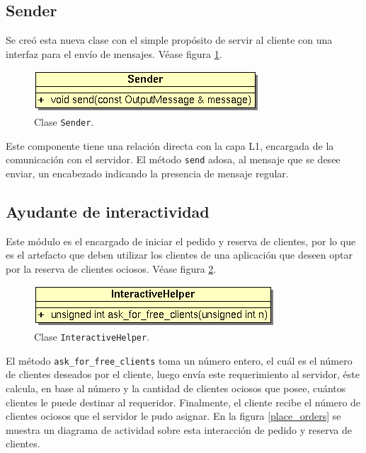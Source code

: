\subsection{Sender}

Se creó esta nueva clase con el simple propósito de servir al cliente con una interfaz para el envío de mensajes. Véase figura
\ref{fud_sender}.

\begin{figure}[ht]
    \begin{center}
        \includegraphics[scale=.75]{images/fud_sender.png}
        \caption{Clase \texttt{Sender}.}
        \label{fud_sender}
    \end{center}
\end{figure}

Este componente tiene una relación directa con la capa L1, encargada de la comunicación con el servidor. El método \texttt{send} adosa, al
mensaje que se desee enviar, un encabezado indicando la presencia de mensaje regular.

\subsection{Ayudante de interactividad}

Este módulo es el encargado de iniciar el pedido y reserva de clientes, por lo que es el artefacto que deben utilizar los clientes de una
aplicación que deseen optar por la reserva de clientes ociosos. Véase figura \ref{fud_interactive_helper}.

\begin{figure}[ht]
    \begin{center}
        \includegraphics[scale=.75]{images/fud_ihelper.png}
        \caption{Clase \texttt{InteractiveHelper}.}
        \label{fud_interactive_helper}
    \end{center}
\end{figure}

El método \texttt{ask\_for\_free\_clients} toma un número entero, el cuál es el número de clientes deseados por el cliente, luego envía
este requerimiento al servidor, éste calcula, en base al número y la cantidad de clientes ociosos que posee, cuántos clientes le puede
destinar al requeridor. Finalmente, el cliente recibe el número de clientes ociosos que el servidor le pudo asignar. En la figura
\ref{place_orders} se muestra un diagrama de actividad sobre esta interacción de pedido y reserva de clientes.

